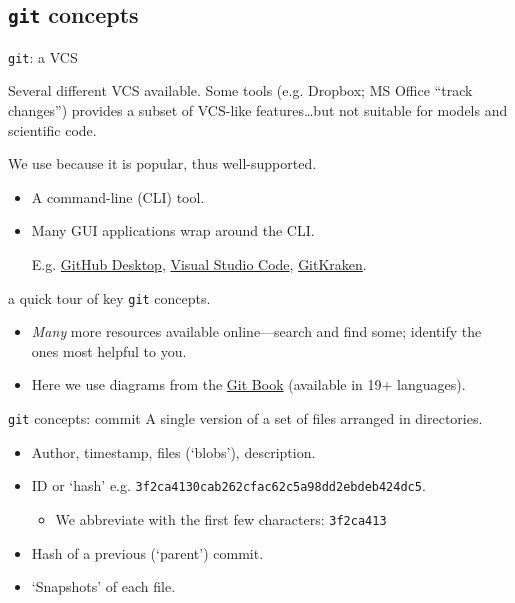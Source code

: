 \documentclass[12pt,aspectratio=169]{beamer}
\begin{document}
\subsection{\texttt{git} concepts}
\begin{frame}{\texttt{git}: a VCS}

  Several different VCS available.
  Some tools (e.g. Dropbox; MS Office “track changes”) provides a subset of VCS-like features…but not suitable for models and scientific code.

  \bigskip
  We use  because it is popular, thus well-supported.
  \begin{itemize}
    \item A command-line (CLI) tool.
    \item Many GUI applications wrap around the CLI.

          E.g.
          \href{https://desktop.github.com/}{GitHub Desktop},
          \href{https://vscode.github.com/}{Visual Studio Code},
          \href{https://www.gitkraken.com/}{GitKraken}.
  \end{itemize}

  \bigskip
   a quick tour of key \texttt{git} concepts.
  \begin{itemize}
    \item \emph{Many} more resources available online—search and find some;
          identify the ones most helpful to you.
    \item Here we use diagrams from the \href{https://git-scm.com/book/en/v2/Getting-Started-What-is-Git\%3F}{Git Book} (available in 19+ languages).
  \end{itemize}
\end{frame}

\begin{frame}[fragile]{\texttt{git} concepts: commit} \large
  A single version of a set of files arranged in directories.

  \bigskip
  \begin{itemize}
    \item Author, timestamp, files (‘blobs’), description.
    \item ID or ‘hash’ e.g. \texttt{3f2ca4130cab262cfac62c5a98dd2ebdeb424dc5}.
          \begin{itemize}
            \item We abbreviate with the first few characters: \texttt{3f2ca413}
          \end{itemize}
    \item Hash of a previous (‘parent’) commit.
    \item ‘Snapshots’ of each file.
  \end{itemize}
\end{frame}
\end{document}
